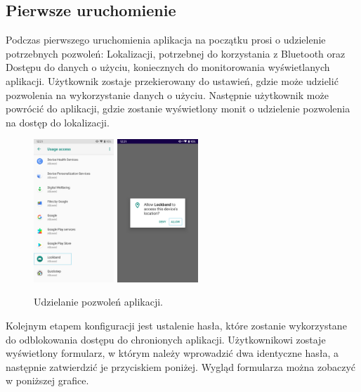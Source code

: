 \subsection{Pierwsze uruchomienie}
Podczas pierwszego uruchomienia aplikacja na początku prosi o udzielenie potrzebnych pozwoleń: Lokalizacji, potrzebnej do korzystania z Bluetooth oraz Dostępu do danych o użyciu, koniecznych do monitorowania wyświetlanych aplikacji. Użytkownik zostaje przekierowany do ustawień, gdzie może udzielić pozwolenia na wykorzystanie danych o użyciu. Następnie użytkownik może powrócić do aplikacji, gdzie zostanie wyświetlony monit o udzielenie pozwolenia na dostęp do lokalizacji. 
\begin{figure}[H]
    \begin{center}
        \includegraphics[width=0.27\textwidth]{app_screenshots/usage_stats_permission.png}
        \includegraphics[width=0.27\textwidth]{app_screenshots/location_permission.png}
    \end{center}
    \caption{{\color{dgray}Udzielanie pozwoleń aplikacji.}} \label{usageStats}
\end{figure}
Kolejnym etapem konfiguracji jest ustalenie hasła, które zostanie wykorzystane do odblokowania dostępu do chronionych aplikacji. Użytkownikowi zostaje wyświetlony formularz, w którym należy wprowadzić dwa identyczne hasła, a następnie zatwierdzić je przyciskiem poniżej. Wygląd formularza można zobaczyć w poniższej grafice.
